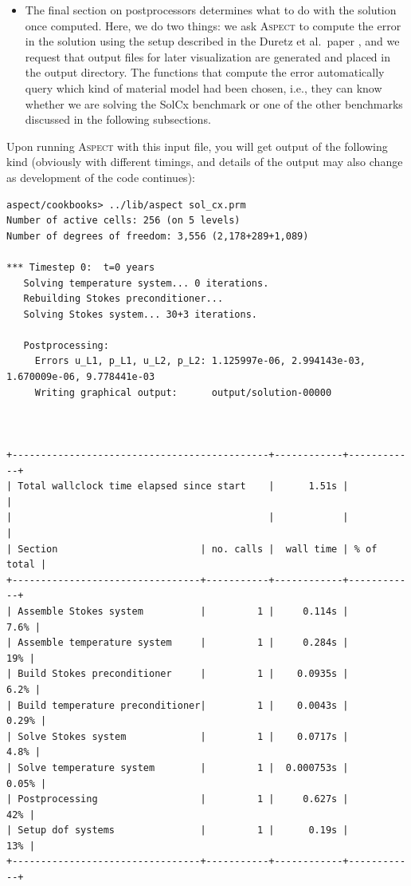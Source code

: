 \documentclass{article}
\newcommand{\aspect}{\textsc{Aspect}}
\begin{document}
\begin{itemize}
\item The final section on postprocessors determines what to do with the
  solution once computed. Here, we do two things: we ask \aspect{} to compute
  the error in the solution using the setup described in the Duretz et
  al.~paper \cite{DMGT11}, and we request that output files for later
  visualization are generated and placed in the output directory. The
  functions that compute the error automatically query which kind of material
  model had been chosen, i.e., they can know whether we are solving the SolCx
  benchmark or one of the other benchmarks discussed in the following
  subsections.
\end{itemize}

Upon running \aspect{} with this input file, you will get output of the
following kind (obviously with different timings, and details of the output
may also change as development of the code continues):
\begin{lstlisting}[frame=single,language=ksh]
aspect/cookbooks> ../lib/aspect sol_cx.prm
Number of active cells: 256 (on 5 levels)
Number of degrees of freedom: 3,556 (2,178+289+1,089)

*** Timestep 0:  t=0 years
   Solving temperature system... 0 iterations.
   Rebuilding Stokes preconditioner...
   Solving Stokes system... 30+3 iterations.

   Postprocessing:
     Errors u_L1, p_L1, u_L2, p_L2: 1.125997e-06, 2.994143e-03, 1.670009e-06, 9.778441e-03
     Writing graphical output:      output/solution-00000



+---------------------------------------------+------------+------------+
| Total wallclock time elapsed since start    |      1.51s |            |
|                                             |            |            |
| Section                         | no. calls |  wall time | % of total |
+---------------------------------+-----------+------------+------------+
| Assemble Stokes system          |         1 |     0.114s |       7.6% |
| Assemble temperature system     |         1 |     0.284s |        19% |
| Build Stokes preconditioner     |         1 |    0.0935s |       6.2% |
| Build temperature preconditioner|         1 |    0.0043s |      0.29% |
| Solve Stokes system             |         1 |    0.0717s |       4.8% |
| Solve temperature system        |         1 |  0.000753s |      0.05% |
| Postprocessing                  |         1 |     0.627s |        42% |
| Setup dof systems               |         1 |      0.19s |        13% |
+---------------------------------+-----------+------------+------------+
\end{lstlisting}
\end{document}
